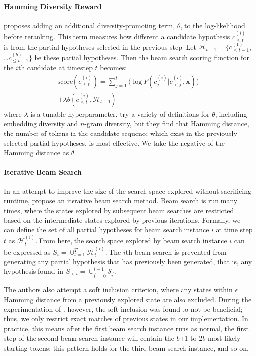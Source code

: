 \paragraph{Hamming Diversity Reward}\quad
\citet{vijayakumar2016diverse} proposes adding an additional diversity-promoting term, $\theta$, to the log-likelihood before reranking.
This term measures how different a candidate hypothesis $c^{(i)}_{\leq t}$ is from the partial hypotheses selected in the previous step. Let $\mathcal{H}_{t-1} = \{c^{(1)}_{\leq t-1}$, \ldots $c^{(b)}_{\leq t-1}\}$ be these partial hypotheses.
Then the beam search scoring function for the $i$th candidate at timestep $t$ becomes:
\begin{align*}
    \text{score}(c^{(i)}_{\leq t}) = \sum_{j=1}^t \big(\log P(c^{(i)}_j | c^{(i)}_{<j}, \textbf{x})\big) \\+ \lambda\theta(c^{(i)}_{\leq t}, \mathcal{H}_{t-1})
\end{align*}
where $\lambda$ is a tunable hyperparameter. \citet{vijayakumar2016diverse} try a variety of definitions for $\theta$, including embedding diversity and $n$-gram diversity, but they find that Hamming distance, the number of tokens in the candidate sequence which exist in the previously selected partial hypotheses, is most effective. We take the negative of the Hamming distance as $\theta$.

\paragraph{Iterative Beam Search}\quad
In an attempt to improve the size of the search space explored without sacrificing runtime, \citet{kulikov2018importance} propose an iterative beam search method.
Beam search is run many times, where the states explored by subsequent beam searches are restricted based on the intermediate states explored by previous iterations.
Formally, we can define the set of all partial hypotheses for beam search instance $i$ at time step $t$ as $\mathcal{H}_t^{(i)}$. From here, the search space explored by beam search instance $i$ can be expressed as $S_i = \cup_{t=1}^T \mathcal{H}_t^{(i)}$.
The $i$th beam search is prevented from generating any partial hypothesis that has previously been generated, that is, any hypothesis found in $S_{<i} = \cup_{i^{\prime}=0}^{i-1}S_{i^{\prime}}$.

The authors also attempt a soft inclusion criterion, where any states within $\epsilon$ Hamming distance from a previously explored state are also excluded. During the experimentation of \citet{kulikov2018importance}, however, the soft-inclusion was found to not be beneficial; thus, we only restrict exact matches of previous states in our implementation.
In practice, this means after the first beam search instance runs as normal, the first step of the second beam search instance will contain the $b$+1 to 2$b$-most likely starting tokens; this pattern holds for the third beam search instance, and so on.

